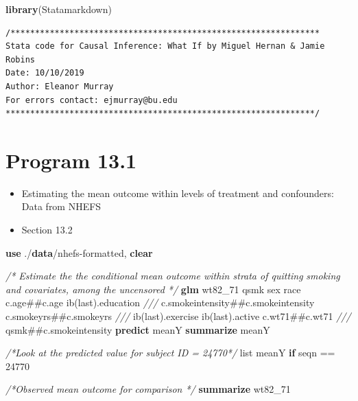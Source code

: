 \documentclass[
  10pt,
]{book}
\newenvironment{Shaded}{\begin{snugshade}}{\end{snugshade}}
\newcommand{\CommentTok}[1]{\textcolor[rgb]{0.56,0.35,0.01}{\textit{#1}}}
\newcommand{\FunctionTok}[1]{\textcolor[rgb]{0.00,0.00,0.00}{#1}}
\newcommand{\KeywordTok}[1]{\textcolor[rgb]{0.13,0.29,0.53}{\textbf{#1}}}
\newcommand{\NormalTok}[1]{#1}
\newcommand{\OtherTok}[1]{\textcolor[rgb]{0.56,0.35,0.01}{#1}}
\providecommand{\tightlist}{%
  \setlength{\itemsep}{0pt}\setlength{\parskip}{0pt}}
\begin{document}
\begin{Shaded}
\begin{Highlighting}[]
\KeywordTok{library}\NormalTok{(Statamarkdown)}
\end{Highlighting}
\end{Shaded}

\begin{verbatim}
/***************************************************************
Stata code for Causal Inference: What If by Miguel Hernan & Jamie Robins
Date: 10/10/2019
Author: Eleanor Murray 
For errors contact: ejmurray@bu.edu
***************************************************************/
\end{verbatim}

\hypertarget{program-13.1-1}{%
\section{Program 13.1}\label{program-13.1-1}}

\begin{itemize}
\tightlist
\item
  Estimating the mean outcome within levels of treatment and confounders: Data from NHEFS
\item
  Section 13.2
\end{itemize}

\begin{Shaded}
\begin{Highlighting}[]
\KeywordTok{use}\NormalTok{ ./}\KeywordTok{data}\NormalTok{/nhefs{-}formatted, }\KeywordTok{clear}

\CommentTok{/* Estimate the the conditional mean outcome within strata of quitting }
\CommentTok{smoking and covariates, among the uncensored */}
\KeywordTok{glm}\NormalTok{ wt82\_71 qsmk sex race c.age\#\#c.age ib(}\FunctionTok{last}\NormalTok{).education }\CommentTok{///}
\NormalTok{  c.smokeintensity\#\#c.smokeintensity c.smokeyrs\#\#c.smokeyrs }\CommentTok{///}
\NormalTok{  ib(}\FunctionTok{last}\NormalTok{).exercise ib(}\FunctionTok{last}\NormalTok{).active c.wt71\#\#c.wt71 }\CommentTok{///}
\NormalTok{  qsmk\#\#c.smokeintensity}
\KeywordTok{predict}\NormalTok{ meanY}
\KeywordTok{summarize}\NormalTok{ meanY}

\CommentTok{/*Look at the predicted value for subject ID = 24770*/}
\OtherTok{list}\NormalTok{ meanY }\KeywordTok{if}\NormalTok{ seqn == 24770}

\CommentTok{/*Observed mean outcome for comparison */}
\KeywordTok{summarize}\NormalTok{ wt82\_71}
\end{Highlighting}
\end{Shaded}
\end{document}
